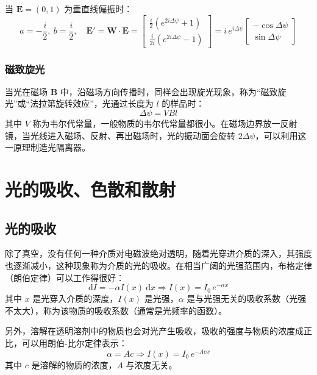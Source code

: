 \documentclass[UTF8]{report}
\theoremstyle{MyLineTheoremStyle} %
\theoremstyle{MyBlockTheoremStyle} %
\theoremstyle{MySubsubsectionStyle} %
\begin{document}
当 $\boldsymbol{E} = (0, 1)$ 为垂直线偏振时：
\begin{equation}
a = -\frac{i}{2},\ b = \frac{i}{2},\quad \boldsymbol{E'} = \boldsymbol{W}\cdot \boldsymbol{E} =
\begin{bmatrix}
    \frac{i}{2}\left(e^{2 i \Delta \psi} + 1\right) \\
    \frac{i}{2i}(e^{2 i \Delta \psi} - 1)
\end{bmatrix}
= 
i\, e^{i \Delta \psi}
\begin{bmatrix}
    -\cos \Delta \psi \\
    \sin \Delta \psi
\end{bmatrix}
\end{equation}

\subsection{磁致旋光}
当光在磁场 $\boldsymbol{B}$ 中，沿磁场方向传播时，同样会出现旋光现象，称为“磁致旋光”或“法拉第旋转效应”，光通过长度为 $l$ 的样品时：
\begin{equation}
\Delta \psi = VBl
\end{equation}
其中 $V$ 称为韦尔代常量，一般物质的韦尔代常量都很小。在磁场边界放一反射镜，当光线进入磁场、反射、再出磁场时，光的振动面会旋转 $2\Delta \psi$，可以利用这一原理制造光隔离器。






\chapter{光的吸收、色散和散射}\thispagestyle{fancy}
\section{光的吸收}
除了真空，没有任何一种介质对电磁波绝对透明，随着光穿进介质的深入，其强度也逐渐减小，这种现象称为介质的光的吸收。在相当广阔的光强范围内，布格定律（朗伯定律）可以工作得很好：
\begin{equation}
\mathrm{d}I = - \alpha I(x) \ \mathrm{d}x \Longrightarrow I(x) = I_0 \, e^{-\alpha x}
\end{equation}
其中 $x$ 是光穿入介质的深度，$I(x)$ 是光强，$\alpha$ 是与光强无关的吸收系数（光强不太大），称为该物质的吸收系数（通常是光频率的函数）。

另外，溶解在透明溶剂中的物质也会对光产生吸收，吸收的强度与物质的浓度成正比，可以用朗伯-比尔定律表示：
\begin{equation}
\alpha = A c \Longrightarrow I(x) = I_0 \, e^{-A c x}
\end{equation}
其中 $c$ 是溶解的物质的浓度，$A$ 与浓度无关。
\end{document}
